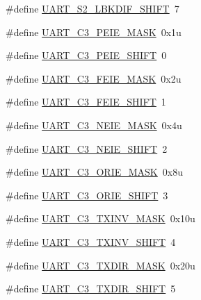 \begin{DoxyCompactItemize}
\item 
\#define \hyperlink{group___u_a_r_t___register___masks_ga42b99a34daa824eb7a8c8dd635ee4a4f}{U\+A\+R\+T\+\_\+\+S2\+\_\+\+L\+B\+K\+D\+I\+F\+\_\+\+S\+H\+I\+FT}~7
\item 
\#define \hyperlink{group___u_a_r_t___register___masks_gadf1ad2301848b5812b84658d02cc2006}{U\+A\+R\+T\+\_\+\+C3\+\_\+\+P\+E\+I\+E\+\_\+\+M\+A\+SK}~0x1u
\item 
\#define \hyperlink{group___u_a_r_t___register___masks_gad14f9faaee56b818a04794694960fa6a}{U\+A\+R\+T\+\_\+\+C3\+\_\+\+P\+E\+I\+E\+\_\+\+S\+H\+I\+FT}~0
\item 
\#define \hyperlink{group___u_a_r_t___register___masks_gaf165d0ae5fd464a2ec367e29d1dedcb2}{U\+A\+R\+T\+\_\+\+C3\+\_\+\+F\+E\+I\+E\+\_\+\+M\+A\+SK}~0x2u
\item 
\#define \hyperlink{group___u_a_r_t___register___masks_gac08e14a1c915cfa377176fc6d491e38d}{U\+A\+R\+T\+\_\+\+C3\+\_\+\+F\+E\+I\+E\+\_\+\+S\+H\+I\+FT}~1
\item 
\#define \hyperlink{group___u_a_r_t___register___masks_ga1e485aea10f0176919ae060d0ee1d709}{U\+A\+R\+T\+\_\+\+C3\+\_\+\+N\+E\+I\+E\+\_\+\+M\+A\+SK}~0x4u
\item 
\#define \hyperlink{group___u_a_r_t___register___masks_gae70ab8b995df889314915948d51ae783}{U\+A\+R\+T\+\_\+\+C3\+\_\+\+N\+E\+I\+E\+\_\+\+S\+H\+I\+FT}~2
\item 
\#define \hyperlink{group___u_a_r_t___register___masks_ga85999d87eca30c526580b0d060f2aff5}{U\+A\+R\+T\+\_\+\+C3\+\_\+\+O\+R\+I\+E\+\_\+\+M\+A\+SK}~0x8u
\item 
\#define \hyperlink{group___u_a_r_t___register___masks_ga3e65d9370ba1e2d05042db7ed72e599b}{U\+A\+R\+T\+\_\+\+C3\+\_\+\+O\+R\+I\+E\+\_\+\+S\+H\+I\+FT}~3
\item 
\#define \hyperlink{group___u_a_r_t___register___masks_ga6c9c90706e66f4bfa8fb53dd0407e579}{U\+A\+R\+T\+\_\+\+C3\+\_\+\+T\+X\+I\+N\+V\+\_\+\+M\+A\+SK}~0x10u
\item 
\#define \hyperlink{group___u_a_r_t___register___masks_ga99b840aeb5c25012354a1cd40ec35de7}{U\+A\+R\+T\+\_\+\+C3\+\_\+\+T\+X\+I\+N\+V\+\_\+\+S\+H\+I\+FT}~4
\item 
\#define \hyperlink{group___u_a_r_t___register___masks_gae9909f5ed584e6647deec86775f025e7}{U\+A\+R\+T\+\_\+\+C3\+\_\+\+T\+X\+D\+I\+R\+\_\+\+M\+A\+SK}~0x20u
\item 
\#define \hyperlink{group___u_a_r_t___register___masks_gafd8df440afc872879f09780112122e6a}{U\+A\+R\+T\+\_\+\+C3\+\_\+\+T\+X\+D\+I\+R\+\_\+\+S\+H\+I\+FT}~5

\end{DoxyCompactItemize}
